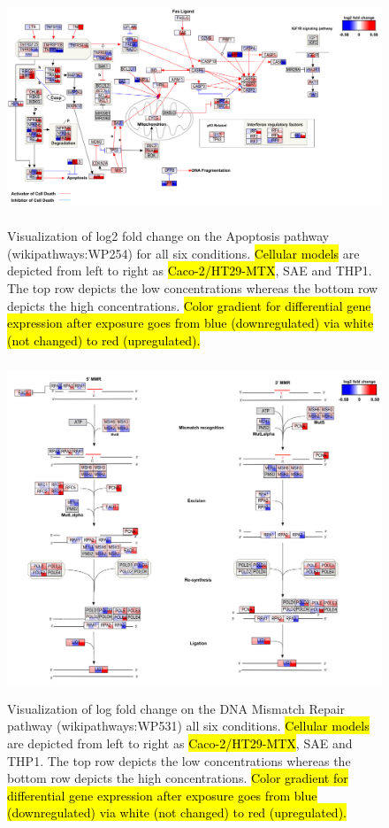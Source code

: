 \documentclass[ijms,article,submit,moreauthors,pdftex]{Definitions/mdpi}
\begin{document}
\begin{figure}[h!]
\includegraphics[height=7cm,keepaspectratio]{figA2.png}
\caption{Visualization of log2 fold change on the Apoptosis pathway (wikipathways:WP254) for all six conditions.
\hl{Cellular models} are depicted from left to right as \hl{Caco-2/HT29-MTX}, SAE and THP1. The top row depicts the low concentrations whereas the bottom row depicts the high concentrations. \hl{Color gradient for differential gene expression after exposure goes from blue (downregulated) via white (not changed) to red (upregulated).}
}
\label{fig:figA1}
\end{figure}

\begin{figure}[h!]
\includegraphics[height=10cm]{figA3.png}
\caption{Visualization of log fold change on the DNA Mismatch Repair pathway (wikipathways:WP531) all six conditions.
\hl{Cellular models} are depicted from left to right as \hl{Caco-2/HT29-MTX}, SAE and THP1. The top row depicts the low concentrations whereas the bottom row depicts the high concentrations. \hl{Color gradient for differential gene expression after exposure goes from blue (downregulated) via white (not changed) to red (upregulated).}
}
\label{fig:figA3}
\end{figure}
\end{document}
